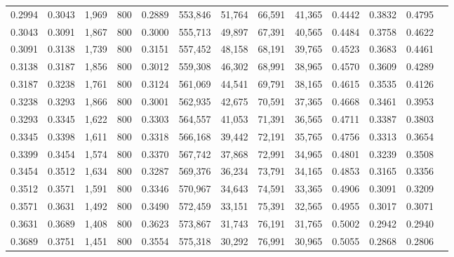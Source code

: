 \begin{tabular}{rrrrrrrrrrrrr}
0.2994 & 0.3043 &  1,969 &   800 &                                     0.2889 & 553,846 &  51,764 &  66,591 &  41,365 & 0.4442 & 0.3832 & 0.4795 \\
0.3043 & 0.3091 &  1,867 &   800 &                                     0.3000 & 555,713 &  49,897 &  67,391 &  40,565 & 0.4484 & 0.3758 & 0.4622 \\
0.3091 & 0.3138 &  1,739 &   800 &                                     0.3151 & 557,452 &  48,158 &  68,191 &  39,765 & 0.4523 & 0.3683 & 0.4461 \\
0.3138 & 0.3187 &  1,856 &   800 &                                     0.3012 & 559,308 &  46,302 &  68,991 &  38,965 & 0.4570 & 0.3609 & 0.4289 \\
0.3187 & 0.3238 &  1,761 &   800 &                                     0.3124 & 561,069 &  44,541 &  69,791 &  38,165 & 0.4615 & 0.3535 & 0.4126 \\
0.3238 & 0.3293 &  1,866 &   800 &                                     0.3001 & 562,935 &  42,675 &  70,591 &  37,365 & 0.4668 & 0.3461 & 0.3953 \\
0.3293 & 0.3345 &  1,622 &   800 &                                     0.3303 & 564,557 &  41,053 &  71,391 &  36,565 & 0.4711 & 0.3387 & 0.3803 \\
0.3345 & 0.3398 &  1,611 &   800 &                                     0.3318 & 566,168 &  39,442 &  72,191 &  35,765 & 0.4756 & 0.3313 & 0.3654 \\
0.3399 & 0.3454 &  1,574 &   800 &                                     0.3370 & 567,742 &  37,868 &  72,991 &  34,965 & 0.4801 & 0.3239 & 0.3508 \\
0.3454 & 0.3512 &  1,634 &   800 &                                     0.3287 & 569,376 &  36,234 &  73,791 &  34,165 & 0.4853 & 0.3165 & 0.3356 \\
0.3512 & 0.3571 &  1,591 &   800 &                                     0.3346 & 570,967 &  34,643 &  74,591 &  33,365 & 0.4906 & 0.3091 & 0.3209 \\
0.3571 & 0.3631 &  1,492 &   800 &                                     0.3490 & 572,459 &  33,151 &  75,391 &  32,565 & 0.4955 & 0.3017 & 0.3071 \\
0.3631 & 0.3689 &  1,408 &   800 &                                     0.3623 & 573,867 &  31,743 &  76,191 &  31,765 & 0.5002 & 0.2942 & 0.2940 \\
0.3689 & 0.3751 &  1,451 &   800 &                                     0.3554 & 575,318 &  30,292 &  76,991 &  30,965 & 0.5055 & 0.2868 & 0.2806 \\

\end{tabular}
